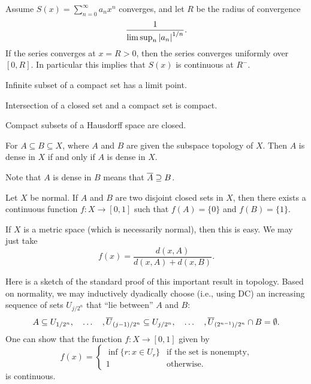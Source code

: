 \begin{namedthm}
    Assume $S(x) = \sum_{n=0}^\infty a_n x^n$ converges, and let $R$ be the radius of convergence \[ \frac{1}{\limsup_n {\lvert a_n \rvert}^{1/n}}.\] If the series converges at $x = R > 0$, then the series converges uniformly over $[0,R]$. In particular this implies that $S(x)$ is continuous at $R^-$.
\end{namedthm}

\begin{prop}
    Infinite subset of a compact set has a limit point.
\end{prop}

\begin{prop}\label{prop:closed-compact-intersect}
    Intersection of a closed set and a compact set is compact.
\end{prop}

\begin{prop}\label{prop:compact-subset-Hausdorff}
    Compact subsets of a Hausdorff space are closed.
\end{prop}

\begin{prop}
    For $A \subseteq B \subseteq X$, where $A$ and $B$ are given the subspace topology of $X$. Then $A$ is dense in $X$ if and only if $A$ is dense in $X$.
\end{prop}

Note that $A$ is dense in $B$ means that $\overline{A} \supseteq B$.

\begin{namedthm}
    Let $X$ be normal. If $A$ and $B$ are two disjoint closed sets in $X$, then there exists a continuous function $f\colon X \to [0,1]$ such that $f(A)=\{0\}$ and $f(B) = \{1\}$.
\end{namedthm}

If $X$ is a metric space (which is necessarily normal), then this is easy. We may just take \[f(x) = \frac{d(x,A)}{d(x,A) + d(x,B)}.\]

Here is a sketch of the standard proof of this important result in topology. Based on normality, we may inductively dyadically choose (i.e., using \textsf{DC}) an increasing sequence of sets $U_{j/2^n}$ that ``lie between'' $A$ and $B$: \[
    A \subseteq U_{1/2^n},\quad \dotsc\quad ,\overline{U}_{(j-1)/2^n} \subseteq U_{j/2^n},\quad \dotsc\quad , \overline{U}_{(2^{n-1})/2^n} \cap B =\emptyset.
\]
One can show that the function $f\colon X\to [0,1]$ given by \[
    f(x) = \begin{cases}
        \inf\{r : x\in U_r\} & \text{if the set is nonempty}, \\
        1 & \text{otherwise}.
    \end{cases}
\] is continuous.

